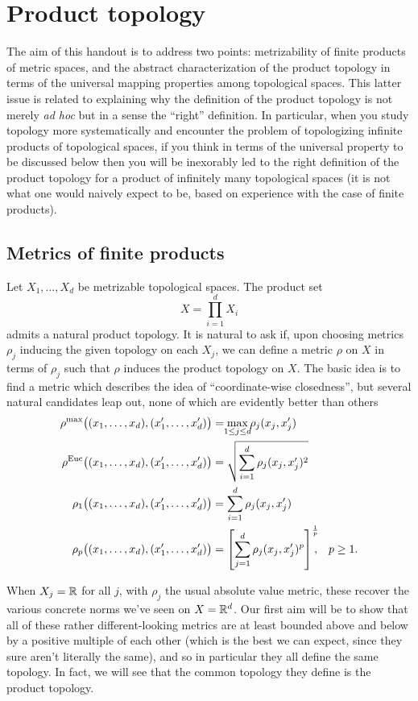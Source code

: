 \section{Product topology}
The aim of this handout is to address two points: metrizability of finite
products of metric spaces, and the abstract characterization of the product
topology in terms of the universal mapping properties among topological
spaces. This latter issue is related to explaining why the definition of
the product topology is not merely \emph{ad hoc} but in a sense the
``right'' definition. In particular, when you study topology more
systematically and encounter the problem of topologizing infinite products
of topological spaces, if you think in terms of the universal property to
be discussed below then you will be inexorably led to the right definition
of the product topology for a product of infinitely many topological spaces
(it is not what one would naively expect to be, based on experience with
the case of finite products).

\subsection{Metrics of finite products}
Let \(X_1,\dotsc,X_d\) be metrizable topological spaces. The product set
\[
  X=\prod_{i=1}^d X_i
\]
admits a natural product topology. It is natural to ask if, upon choosing
metrics \(\rho_j\) inducing the given topology on each \(X_j\), we can
define a metric \(\rho\) on \(X\) in terms of \(\rho_j\) such that \(\rho\)
induces the product topology on \(X\). The basic idea is to find a metric
which describes the idea of ``coordinate-wise closedness'', but several
natural candidates leap out, none of which are evidently better than others
\begin{align*}
  \rho^{\text{max}}\bigl((x_1,\dotsc,x_d),(x_1',\dotsc,x_d')\bigr)
  &=\max_{\mathclap{1\leq j\leq d}}\rho_j(x_j,x_j')\\
  \rho^{\text{Euc}}\bigl((x_1,\dotsc,x_d),(x_1',\dotsc,x_d')\bigr)
  &=\sqrt{\sum_{i=1}^d\rho_j(x_j,x_j')^2}\\
  \rho_1\bigl((x_1,\dotsc,x_d),(x_1',\dotsc,x_d')\bigr)
  &=\sum_{i=1}^d\rho_j(x_j,x_j')\\
  \rho_p\bigl((x_1,\dotsc,x_d),(x_1',\dotsc,x_d')\bigr)
  &=\left[\sum_{j=1}^d\rho_j(x_j,x_j')^p\right]^{\mathrlap{\frac{1}{p}}},&p\geq 1.
\end{align*}

When \(X_j=\mathbb{R}\) for all \(j\), with \(\rho_j\) the usual absolute value
metric, these recover the various concrete norms we've seen on
\(X=\mathbb{R}^d\). Our first aim will be to show that all of these rather
different-looking metrics are at least bounded above and below by a
positive multiple of each other (which is the best we can expect, since
they sure aren't literally the same), and so in particular they all define
the same topology. In fact, we will see that the common topology they
define is the product topology.

